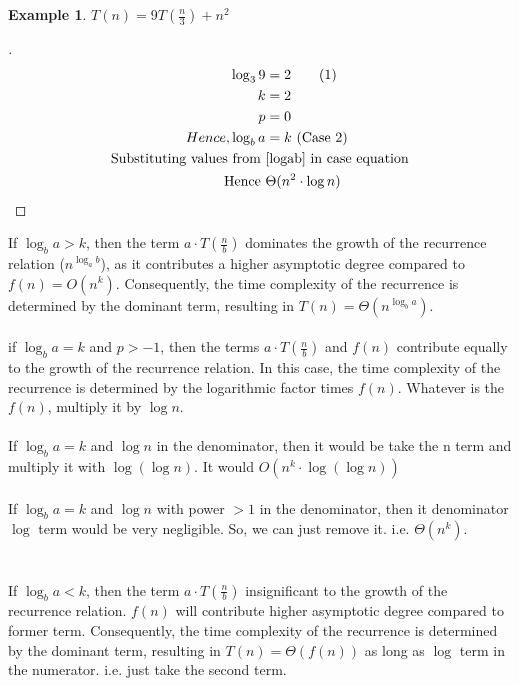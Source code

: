 \documentclass[]{article}
\theoremstyle{plain}
\theoremstyle{definition}
\newtheorem{lem}{Example}[thm]
\begin{document}
\begin{lem}
    $T(n) = 9T(\frac{n}{3}) + n^2$
    \begin{proof}[]
        \begin{align*}
            \log_3{9} &= 2 \tag{1} \label{logab}\\
            k &= 2\\
            p &= 0\\
            Hence, 
            \log_b{a} &= k \text{ (Case 2)}\\
            \text{Substituting values from }  &\text{{\ref{logab}} in case equation}\\
            \text{Hence } &\Theta(n^2 \cdot \log{n})
        \end{align*}
    \end{proof}
\end{lem}

If $\log_b{a} > k$, then the term $a \cdot T\left(\frac{n}{b}\right)$ dominates the growth of the recurrence relation ($n^{\log_a{b}}$), as it contributes a higher asymptotic degree compared to $f(n) = O(n^k)$. Consequently, the time complexity of the recurrence is determined by the dominant term, resulting in $T(n) = \Theta(n^{\log_b{a}})$.
\\
\\
if $\log_b{a} = k$ and $p > -1$, then the terms $a \cdot T\left(\frac{n}{b}\right)$ and $f(n)$ contribute equally to the growth of the recurrence relation. In this case, the time complexity of the recurrence is determined by the logarithmic factor times $f(n)$. Whatever is the $f(n)$, multiply it by $\log{n}$.
\\
\\
If $\log_b{a} = k$ and $\log{n}$ in the denominator, then it would be take the n term and multiply it with $\log{(\log{n})}$. It would $O(n^k \cdot \log{(\log{n})})$
\\
\\
If $\log_b{a} = k$ and $\log{n}$ with power $> 1$ in the denominator, then it denominator $\log$ term would be very negligible. So, we can just remove it. i.e. $\Theta(n^k)$.
\\
\\
\\
If $\log_b{a} < k$, then the term $a \cdot T\left(\frac{n}{b}\right)$ insignificant to the growth of the recurrence relation. $f(n)$ will contribute higher asymptotic degree compared to former term. Consequently, the time complexity of the recurrence is determined by the dominant term, resulting in $T(n) = \Theta(f(n))$ as long as $\log$ term in the numerator. i.e. just take the second term. 
\end{document}
